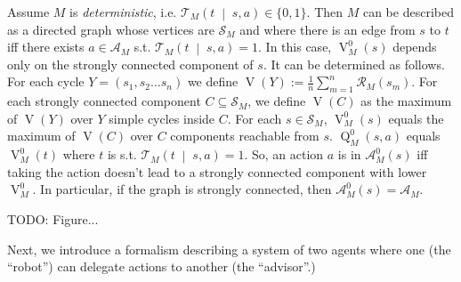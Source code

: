 \documentclass[anon,12pt]{colt2018} %
\newcommand{\AP}[1]{\left(#1\right)}
\newcommand{\APM}[2]{\left(#1\;\middle\vert\;#2\right)}
\newcommand{\A}{\mathcal{A}}
\newcommand{\St}{\mathcal{S}}
\newcommand{\T}{\mathcal{T}}
\newcommand{\R}{\mathcal{R}}
\newcommand{\V}{\operatorname{V}}
\newcommand{\Q}{\operatorname{Q}}
\begin{document}
\begin{samepage}
\begin{example}

Assume $M$ is \emph{deterministic}, i.e. $\T_M\APM{t}{s,a}\in\{0,1\}$. Then $M$ can be described as a directed graph whose vertices are $\St_M$ and where there is an edge from $s$ to $t$ iff there exists $a\in\A_M$ s.t. $\T_M\APM{t}{s,a}=1$. In this case, $\V_M^0(s)$ depends only on the strongly connected component of $s$. It can be determined as follows. For each cycle $Y=\AP{s_1, s_2 \ldots s_n}$ we define $\V(Y):=\frac{1}{n}\sum_{m=1}^n \R_M\AP{s_m}$. For each strongly connected component $C \subseteq \St_M$, we define $\V(C)$ as the maximum of $\V(Y)$ over $Y$ simple cycles inside $C$. For each $s\in\St_M$, $\V_M^0(s)$ equals the maximum of $\V(C)$ over $C$ components reachable from $s$. $\Q_M^0(s,a)$ equals $\V_M^0(t)$ where $t$ is s.t. $\T_M\APM{t}{s,a}=1$. So, an action $a$ is in $\A_M^0(s)$ iff taking the action doesn't lead to a strongly connected component with lower $\V_M^0$. In particular, if the graph is strongly connected, then $\A_M^0(s)=\A_M$.

\end{example}
\end{samepage}

\begin{samepage}
\begin{example}

TODO: Figure...

\end{example}
\end{samepage}

Next, we introduce a formalism describing a system of two agents where one (the \enquote{robot}) can delegate actions to another (the \enquote{advisor}.)
\end{document}
